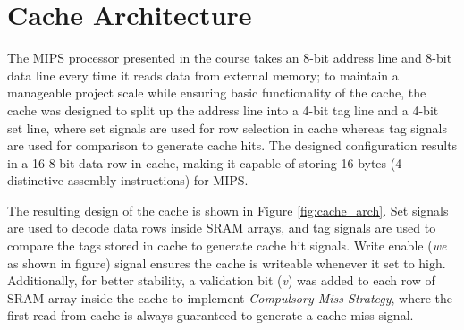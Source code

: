 \documentclass[conference]{IEEEtran}
\begin{document}
%



\section{Cache Architecture}\label{cache_arch}
The MIPS processor presented in the course takes an 8-bit address line and 8-bit data line every time it reads data from external memory; to maintain a manageable project scale while ensuring basic functionality of the cache, the cache was designed to split up the address line into a 4-bit tag line and a 4-bit set line, where set signals are used for row selection in cache whereas tag signals are used for comparison to generate cache hits. The designed configuration results in a 16 8-bit data row in cache, making it capable of storing 16 bytes (4 distinctive assembly instructions) for MIPS.

The resulting design of the cache is shown in Figure \ref{fig:cache_arch}. Set signals are used to decode data rows inside SRAM arrays, and tag signals are used to compare the tags stored in cache to generate cache hit signals. Write enable (\textit{we} as shown in figure) signal ensures the cache is writeable whenever it set to high. Additionally, for better stability, a validation bit (\textit{v}) was added to each row of SRAM array inside the cache to implement \textit{Compulsory Miss Strategy}, where the first read from cache is always guaranteed to generate a cache miss signal.
\end{document}
